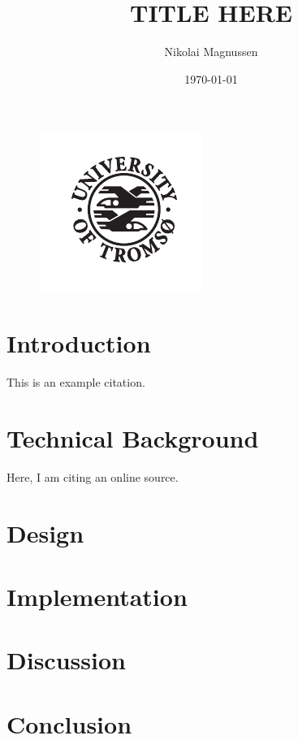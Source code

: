 \documentclass[12pt]{article}
\title{TITLE HERE}
\author{Nikolai Magnussen}
\date{\today}
\begin{document}
\begin{titlingpage}
	\maketitle
	\begin{figure}[hb]
		\centering
		\includegraphics[scale=3.4]{uit.pdf}
	\end{figure}
\end{titlingpage}
\begin{multicols}{2}

\section*{Introduction}
This is an example citation\cite{kake}.

\section*{Technical Background}
Here, I am citing an online source\cite{torsk}.

\section*{Design}

\section*{Implementation}

\section*{Discussion}

\section*{Conclusion}

\end{multicols}
\begin{multicols}{2}
\printbibliography
\end{multicols}
\end{document}
